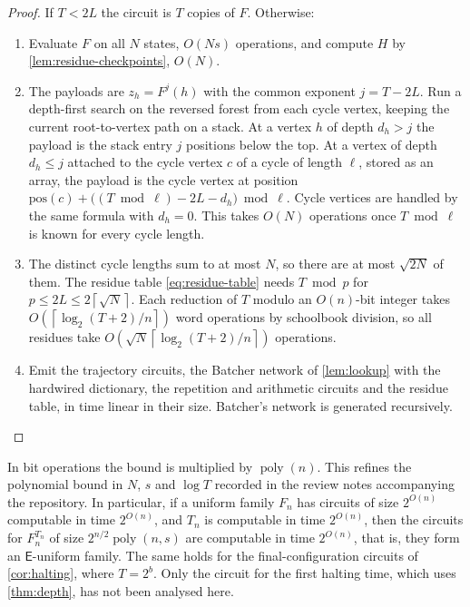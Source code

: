 \documentclass[11pt]{article}
\theoremstyle{definition}
\theoremstyle{remark}
\newcommand{\poly}{\operatorname{poly}}
\newcommand{\ceil}[1]{\left\lceil #1\right\rceil}
\numberwithin{equation}{section}
\begin{document}
\begin{proof}
If $T<2L$ the circuit is $T$ copies of $F$.  Otherwise:
\begin{enumerate}
\item Evaluate $F$ on all $N$ states, $O(Ns)$ operations, and compute $H$ by
  \cref{lem:residue-checkpoints}, $O(N)$.
\item The payloads are $z_h=F^j(h)$ with the common exponent $j=T-2L$.  Run a
  depth-first search on the reversed forest from each cycle vertex,
  keeping the current root-to-vertex path on a stack.  At a vertex $h$ of
  depth $d_h>j$ the payload is the stack entry $j$ positions below the
  top.  At a vertex of depth $d_h\leq j$ attached to the cycle vertex $c$
  of a cycle of length $\ell$, stored as an array, the payload is the cycle
  vertex at position
  $\mathrm{pos}(c)+\bigl((T\bmod\ell)-2L-d_h\bigr)\bmod\ell$.  Cycle
  vertices are handled by the same formula with $d_h=0$.  This takes
  $O(N)$ operations once $T\bmod\ell$ is known for every cycle length.
\item The distinct cycle lengths sum to at most $N$, so there are at most
  $\sqrt{2N}$ of them.  The residue table \cref{eq:residue-table} needs
  $T\bmod p$ for $p\leq 2L\leq2\ceil{\sqrt N}$.  Each reduction of $T$
  modulo an $O(n)$-bit integer takes $O(\ceil{\log_2(T+2)/n})$ word
  operations by schoolbook division, so all residues take
  $O(\sqrt N\ceil{\log_2(T+2)/n})$ operations.
\item Emit the trajectory circuits, the Batcher network of
  \cref{lem:lookup} with the hardwired dictionary, the repetition and
  arithmetic circuits and the residue table, in time linear in their
  size.  Batcher's network is generated recursively.\qedhere
\end{enumerate}
\end{proof}

In bit operations the bound is multiplied by $\poly(n)$.  This refines the
polynomial bound in $N$, $s$ and $\log T$ recorded in the review notes
accompanying the repository.  In particular, if a uniform family $F_n$ has
circuits of size $2^{O(n)}$ computable in time $2^{O(n)}$, and $T_n$ is
computable in time $2^{O(n)}$, then the circuits for $F_n^{T_n}$ of size
$2^{n/2}\poly(n,s)$ are computable in time $2^{O(n)}$, that is, they form an
$\mathsf{E}$-uniform family.  The same holds for the final-configuration
circuits of \cref{cor:halting}, where $T=2^b$.  Only the circuit for the
first halting time, which uses \cref{thm:depth}, has not been analysed
here.
\end{document}
